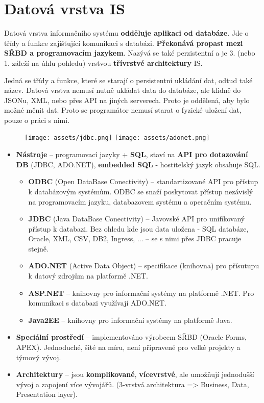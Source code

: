 \section{Datová vrstva IS}
Datová vrstva informačního systému \textbf{odděluje aplikaci od databáze}. Jde o třídy a funkce zajišťující komunikaci s databázi. \textbf{Překonává propast mezi SŘBD a programovacím jazykem}. Nazývá se také perzistentní a je 3. (nebo 1. záleží na úhlu pohledu) vrstvou \textbf{třívrstvé architektury} IS.

Jedná se třídy a funkce, které se starají o persistentní ukládání dat, odtud také název. Datová vrstva nemusí nutně ukládat data do databáze, ale klidně do JSONu, XML, nebo přes API na jiných serverech. Proto je oddělená, aby bylo možné měnit  dat. Proto se programátor nemusí starat o fyzické uložení dat, pouze o práci s nimi.

\begin{figure}[H]
    \centering
    \texttt{[image: assets/jdbc.png]}
    \texttt{[image: assets/adonet.png]}
\end{figure}

\begin{itemize}
    \item \textbf{Nástroje} -- programovací jazyky + \textbf{SQL}, staví na \textbf{API pro dotazování DB} (JDBC, ADO.NET), \textbf{embedded SQL} - hostitelský jazyk obsahuje SQL.
          \begin{itemize}
              \item \textbf{ODBC} (Open DataBase Conectivity) -- standartizované API pro přístup k databázovým systémům. ODBC se snaží poskytovat přístup nezávislý na programovacím jazyku, databazovem systému a operačním systému.
              \item \textbf{JDBC} (Java DataBase Conectivity) -- Javovské API pro unifikovaný přístup k databazi. Bez ohledu kde jsou data uložena - SQL databáze, Oracle, XML, CSV, DB2, Ingress, ... -- se s nimi přes JDBC pracuje stejně.
              \item \textbf{ADO.NET} (Active Data Object) -- specifikace (knihovna) pro přísutupu k datový zdrojům na platformě .NET.
              \item \textbf{ASP.NET} -- knihovny pro informační systémy na platformě .NET. Pro komunikaci s databazi využívají ADO.NET.
              \item \textbf{Java2EE} -- knihovny pro informační systémy na platformě Java.
          \end{itemize}
    \item\textbf{Speciální prostředí} -- implementováno výrobcem SŘBD (Oracle Forms, APEX). Jednoduché, šité na míru, není připravené pro velké projekty a týmový vývoj.
    \item \textbf{Architektury} -- jsou \textbf{komplikované}, \textbf{vícevrstvé}, ale umožňují jednodušší vývoj a zapojení více vývojářů. (3-vrstvá architektura => Business, Data, Presentation layer).
\end{itemize}

